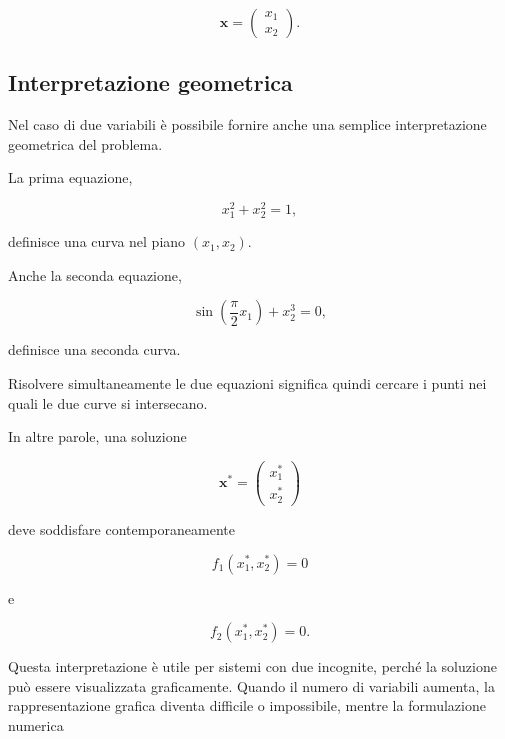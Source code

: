 \begin{equation*}
    \mathbf{x}
    =
    \begin{pmatrix}
        x_1\\
        x_2
    \end{pmatrix}.
\end{equation*}


\subsection{Interpretazione geometrica}

Nel caso di due variabili è possibile fornire anche una semplice
interpretazione geometrica del problema.

La prima equazione,

\begin{equation*}
    x_1^2+x_2^2=1,
\end{equation*}

definisce una curva nel piano $(x_1,x_2)$.

Anche la seconda equazione,

\begin{equation*}
    \sin\left(\frac{\pi}{2}x_1\right)+x_2^3=0,
\end{equation*}

definisce una seconda curva.

Risolvere simultaneamente le due equazioni significa quindi cercare
i punti nei quali le due curve si intersecano.

In altre parole, una soluzione

\begin{equation*}
    \mathbf{x}^*
    =
    \begin{pmatrix}
        x_1^*\\
        x_2^*
    \end{pmatrix}
\end{equation*}

deve soddisfare contemporaneamente

\begin{equation*}
    f_1(x_1^*,x_2^*)=0
\end{equation*}

e

\begin{equation*}
    f_2(x_1^*,x_2^*)=0.
\end{equation*}

Questa interpretazione è utile per sistemi con due incognite, perché
la soluzione può essere visualizzata graficamente. Quando il numero
di variabili aumenta, la rappresentazione grafica diventa difficile
o impossibile, mentre la formulazione numerica

